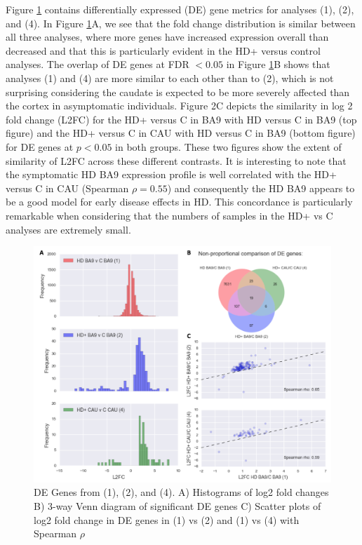 \documentclass[fleqn,10pt,table]{wlscirep}
\begin{document}
Figure \ref{fig:de_genes} contains differentially expressed (DE) gene metrics for analyses (1), (2), and (4).
In Figure \ref{fig:de_genes}A, we see that the fold change distribution is similar between all three analyses, where more genes have increased expression overall than decreased and that this is particularly evident in the HD+ versus control analyses.
The overlap of DE genes at FDR $< 0.05$ in Figure \ref{fig:de_genes}B shows that analyses (1) and (4) are more similar to each other than to (2), which is not surprising considering the caudate is expected to be more severely affected than the cortex in asymptomatic individuals.
Figure 2C depicts the similarity in log 2 fold change (L2FC) for the HD+ versus C in BA9 with HD versus C in BA9 (top figure) and the HD+ versus C in CAU with HD versus C in BA9 (bottom figure) for DE genes at $p<0.05$ in both groups.
These two figures show the extent of similarity of L2FC across these different contrasts.
It is interesting to note that the symptomatic HD BA9 expression profile is well correlated with the HD+ versus C in CAU (Spearman $\rho=0.55$) and consequently the HD BA9 appears to be a good model for early disease effects in HD.
This concordance is particularly remarkable when considering that the numbers of samples in the HD+ vs C analyses are extremely small.


\begin{figure}
\centering
\includegraphics[width=0.65\linewidth]{Histo_venn.png}
\caption{DE Genes from (1), (2), and (4). A) Histograms of log2 fold changes B) 3-way Venn diagram of significant DE genes C) Scatter plots of log2 fold change in DE genes in (1) vs (2) and (1) vs (4) with Spearman $\rho$ \label{fig:de_genes}}
\end{figure}
\end{document}
